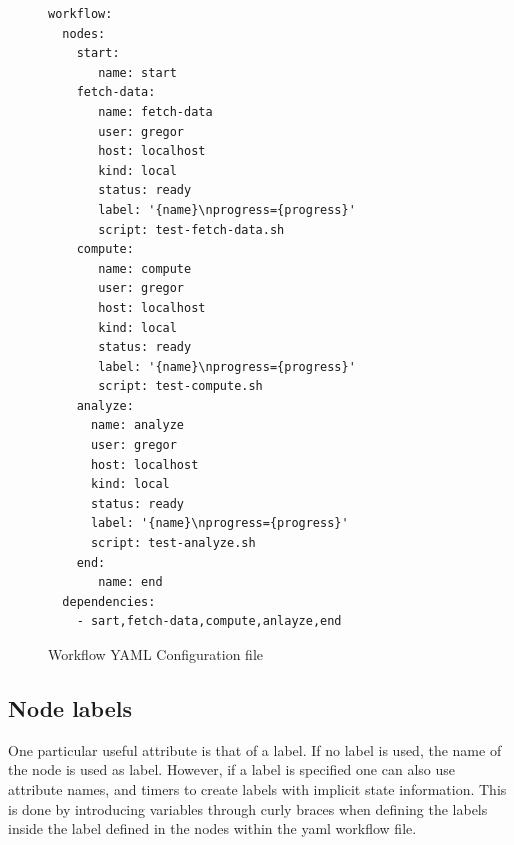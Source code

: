 \begin{figure}
\begin{verbatim}
workflow:
  nodes:
    start:
       name: start
    fetch-data:
       name: fetch-data
       user: gregor
       host: localhost
       kind: local
       status: ready
       label: '{name}\nprogress={progress}'
       script: test-fetch-data.sh
    compute:
       name: compute
       user: gregor
       host: localhost
       kind: local
       status: ready
       label: '{name}\nprogress={progress}'
       script: test-compute.sh
    analyze:
      name: analyze
      user: gregor
      host: localhost
      kind: local
      status: ready
      label: '{name}\nprogress={progress}'
      script: test-analyze.sh
    end:
       name: end
  dependencies:
    - sart,fetch-data,compute,anlayze,end
\end{verbatim}
\caption{Workflow YAML Configuration file}\label{fig:workflow-example}
\label{fig:yaml-file}
\end{figure}

\begin{table}[htb]
\caption{Node attributes}\label{tab:node-attributes}
\end{table}

\subsection{Node labels}

One particular useful attribute is that of a label. If no label is
used, the name of the node is used as label. However, if a label is
specified one can also use attribute names, and timers to create labels
with implicit state information. This is done by introducing variables
through curly braces when defining the labels inside the label defined
in the nodes within the yaml workflow file.


